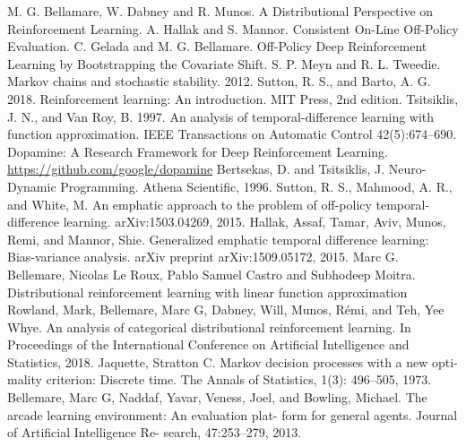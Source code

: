 \documentclass[12pt,a4paper,openright,twoside]{article}
\numberwithin{equation}{section}
\theoremstyle{definition}
\theoremstyle{remark}
\theoremstyle{plain}
\begin{document}
\thispagestyle{plain}
\begin{thebibliography}{50}

	 M. G. Bellamare, W. Dabney and R. Munos. A Distributional Perspective on Reinforcement Learning.
	 A. Hallak and S. Mannor. Consistent On-Line Off-Policy Evaluation.
	 C. Gelada and M. G. Bellamare. Off-Policy Deep Reinforcement Learning by Bootstrapping the Covariate Shift.
	  S. P. Meyn and R. L. Tweedie. Markov chains and stochastic stability. 2012.
	 Sutton, R. S., and Barto, A. G. 2018. Reinforcement learning: An introduction. MIT Press, 2nd edition.
	 Tsitsiklis, J. N., and Van Roy, B. 1997. An analysis of temporal-difference learning with function approximation. IEEE Transactions on Automatic Control 42(5):674–690.
	 Dopamine: {A} Research Framework for Deep Reinforcement Learning. \url{https://github.com/google/dopamine}
	 Bertsekas, D. and Tsitsiklis, J. Neuro-Dynamic Programming. Athena Scientific, 1996.
	 Sutton, R. S., Mahmood, A. R., and White, M. An emphatic approach to the problem of off-policy temporal- difference learning. arXiv:1503.04269, 2015.
	 Hallak, Assaf, Tamar, Aviv, Munos, Remi, and Mannor, Shie. Generalized emphatic temporal difference learning: Bias-variance analysis. arXiv preprint arXiv:1509.05172, 2015.
	 Marc G. Bellemare, Nicolas Le Roux, Pablo Samuel Castro and Subhodeep Moitra. Distributional reinforcement learning with linear function approximation
	 Rowland, Mark, Bellemare, Marc G, Dabney, Will, Munos, Rémi, and Teh, Yee Whye. An analysis of categorical distributional reinforcement learning. In Proceedings of the International Conference on Artificial Intelligence and Statistics, 2018.
	 Jaquette, Stratton C. Markov decision processes with a new opti- mality criterion: Discrete time. The Annals of Statistics, 1(3): 496–505, 1973.
	 Bellemare, Marc G, Naddaf, Yavar, Veness, Joel, and Bowling, Michael. The arcade learning environment: An evaluation plat- form for general agents. Journal of Artificial Intelligence Re- search, 47:253–279, 2013.





\end{thebibliography}


\end{document}
